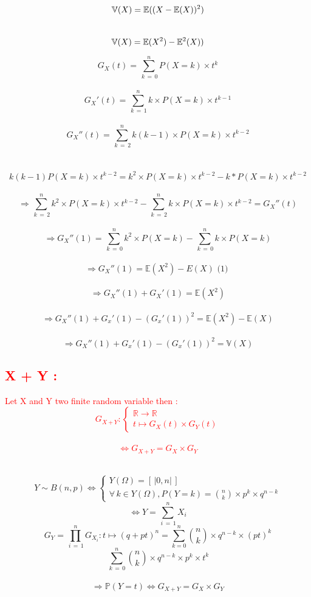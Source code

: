 \documentclass[a4paper,12pt]{article}
\begin{document}
\textcolor{red}{\[
\mathbb{V}(X) = \mathbb{E} ((X - \mathbb{E}(X))^2) \\
\]\\
\[
\mathbb{V}(X) = \mathbb{E}(X^2) - \mathbb{E}^2(X))\\
\]}

\[
G_X(t) = \sum_{\,k\, =\, 0}^{n}{P(X = k) \times t^k}
\]\\
\[
G_X'(t) = \sum_{\,k\, =\, 1}^{n}{k \times P(X = k) \times t^{k-1}}
\]\\
\[
G_X''(t) = \sum_{\,k\, =\, 2}^{n}{k(k-1) \times P(X = k) \times t^{k-2}}
\] \\
 \\\[ k(k-1)P(X = k) \times t^{k - 2} =
k^2 \times P(X = k) \times t^{k - 2} - k * P(X = k) \times t^{k-2} 
\]\\
\[
\Rightarrow \sum_{\,k\, =\, 2}^{n}{k^2 \times P(X = k) \times t^{k-2}} - \sum_{\,k\, =\, 2}^{n}{k \times P(X = k) \times t^{k-2}} = G_X''(t)
\]
\\
\[
\Rightarrow G_X''(1)= \sum_{\,k\, =\, 0}^{n}{k^2 \times P(X = k) } - \sum_{\,k\, =\, 0}^{n}{k \times P(X = k) }
\]\\
\[
\Rightarrow G_X''(1) = \mathbb{E}(X^2) - E(X) \text{ (1) }
\] \\
 \[
\Rightarrow G_X''(1) + G_X'(1) = \mathbb{E}(X^2)
\] 
\\
\[
\Rightarrow G_X''(1) + G_x'(1) - (G_x'(1))^2 = \mathbb{E}(X^2) - \mathbb{E}(X)
\]
\\
\[
\Rightarrow G_X''(1) + G_x'(1) - (G_x'(1))^2 = \mathbb{V} (X)
\]

\textcolor{red}{\subsection*{X + Y :}} \bigskip
\textcolor{red}{Let X and Y two finite random variable then :}\\
\textcolor{red}{\[
G_{X+Y} : \begin{cases}
\mathbb{R} \rightarrow \mathbb{R} \\
t \mapsto G_X(t) \times G_Y(t)
\end{cases}
\]\\
\[
\Leftrightarrow G_{X+Y} = G_X \times G_Y
\]}

\\
\[
Y \sim B(n, p) \Leftrightarrow \begin{cases}
    Y(\Omega) =  \left[\,|0, n|\,\right] \\
    \forall \, k\in Y(\Omega), P(Y = k) = \binom{n}{k} \times p^k \times q^{n-k}
 \end{cases}
\]
\[
\Leftrightarrow Y = \sum_{\,i\, =\,1}^{n}{X_i}
\]
\[
G_Y = \prod_{\,i\,=\,1}^{n} {G_{X_i} :  t \mapsto(q + pt)^n = \sum_{k = 0}^{n} {\binom{n}{k} \times q^{n-k}\times (pt)^k}}
\]
\[
\sum_{\,k \,=\, 0}^{n} {\binom{n}{k} \times q^{n-k}\times p^k \times t^k}
\]\\
\[
\Rightarrow \mathbb{P}(Y = t) \Leftrightarrow G_{X+Y} = G_X \times G_Y
\]\\
\end{document}
